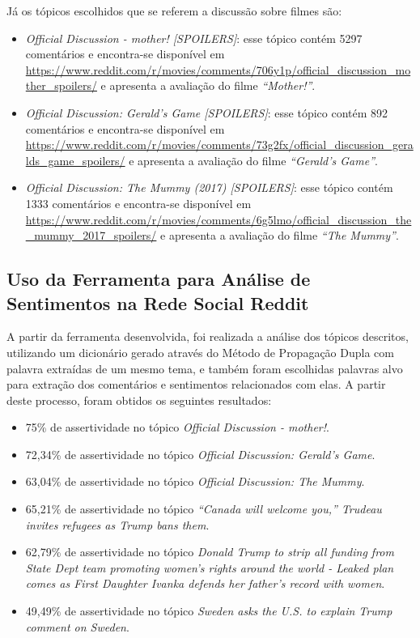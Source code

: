 Já os tópicos escolhidos que se referem a discussão sobre filmes são:

\begin{itemize}
  \item
  \textit{Official Discussion - mother! [SPOILERS]}: esse tópico contém 5297
  comentários e encontra-se disponível em
  \url{https://www.reddit.com/r/movies/comments/706y1p/official_discussion_mother_spoilers/}
  e apresenta a avaliação do filme \textit{``Mother!''}.
  \item
  \textit{Official Discussion: Gerald's Game [SPOILERS]}: esse tópico contém 892
  comentários e
  encontra-se disponível em
  \url{https://www.reddit.com/r/movies/comments/73g2fx/official_discussion_geralds_game_spoilers/}
  e apresenta a avaliação do filme \textit{``Gerald's Game''}.
    \item
  \textit{Official Discussion: The Mummy (2017) [SPOILERS]}: esse tópico contém
  1333 comentários e
  encontra-se disponível em
  \url{https://www.reddit.com/r/movies/comments/6g5lmo/official_discussion_the_mummy_2017_spoilers/}
  e apresenta a avaliação do filme \textit{``The Mummy''}.
  
\end{itemize}



\subsection{Uso da Ferramenta para Análise de
Sentimentos na Rede Social Reddit}

A partir da ferramenta desenvolvida, foi realizada a análise dos tópicos
descritos, utilizando um dicionário gerado através do
Método de Propagação Dupla com palavra extraídas de um mesmo tema, e também
foram escolhidas palavras alvo para extração dos comentários e sentimentos
relacionados com elas. A partir deste processo, foram obtidos os seguintes
resultados:

\begin{itemize}
  \item 75\% de assertividade no tópico \textit{Official Discussion - mother!}.
  \item 72,34\% de assertividade no tópico \textit{Official Discussion: Gerald's
  Game}.
  \item 63,04\% de assertividade no tópico \textit{Official Discussion: The
  Mummy}.
  \item 65,21\% de assertividade no tópico \textit{“Canada will welcome you,”
  Trudeau invites refugees as Trump bans them}.
  \item 62,79\% de assertividade no tópico \textit{Donald Trump to strip all
  funding from State Dept team promoting women's rights around the world - Leaked plan comes as First Daughter Ivanka defends her father's record with women}.
  \item 49,49\% de assertividade no tópico \textit{Sweden asks the U.S. to
  explain Trump comment on Sweden}.
\end{itemize}


